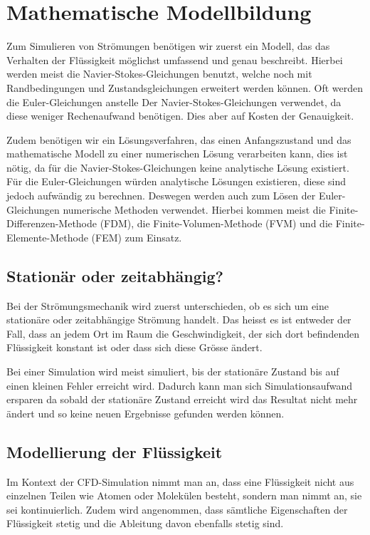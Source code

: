 %
%
%
%
\section{Mathematische Modellbildung
\label{openfoam:section:teil1}}
Zum Simulieren von Strömungen benötigen wir zuerst ein Modell, das das Verhalten der Flüssigkeit möglichst umfassend und genau beschreibt. 
Hierbei werden meist die Navier-Stokes-Gleichungen benutzt, welche noch mit Randbedingungen und Zustandsgleichungen erweitert werden können. 
Oft werden die Euler-Gleichungen anstelle Der Navier-Stokes-Gleichungen verwendet, da diese weniger Rechenaufwand benötigen.
Dies aber auf Kosten der Genauigkeit.

Zudem benötigen wir ein Lösungsverfahren, das einen Anfangszustand und das mathematische Modell zu einer numerischen Lösung verarbeiten kann, dies ist nötig, da für die Navier-Stokes-Gleichungen keine analytische Lösung existiert.
Für die Euler-Gleichungen würden analytische Lösungen existieren, diese sind jedoch aufwändig zu berechnen.
Deswegen werden auch zum Lösen der Euler-Gleichungen numerische Methoden verwendet.
Hierbei kommen meist die Finite-Differenzen-Methode (FDM), die Finite-Volumen-Methode (FVM) und die Finite-Elemente-Methode (FEM) zum Einsatz. 

\subsection{Stationär oder zeitabhängig?}
Bei der Strömungsmechanik wird zuerst unterschieden, ob es sich um eine stationäre oder zeitabhängige Strömung handelt.
Das heisst es ist entweder der Fall, dass an jedem Ort im Raum die Geschwindigkeit, der sich dort befindenden Flüssigkeit  konstant ist oder dass sich diese Grösse ändert.

Bei einer Simulation wird meist simuliert, bis der stationäre Zustand bis auf einen kleinen Fehler erreicht wird.
Dadurch kann man sich Simulationsaufwand ersparen da sobald der stationäre Zustand erreicht wird das Resultat nicht mehr ändert und so keine neuen Ergebnisse gefunden werden können.

\subsection{Modellierung der Flüssigkeit}
Im Kontext der CFD-Simulation nimmt man an, dass eine Flüssigkeit nicht aus einzelnen Teilen wie Atomen oder Molekülen besteht, sondern man nimmt an, sie sei kontinuierlich. 
Zudem wird angenommen, dass sämtliche Eigenschaften der Flüssigkeit stetig und die Ableitung davon ebenfalls stetig sind. %

